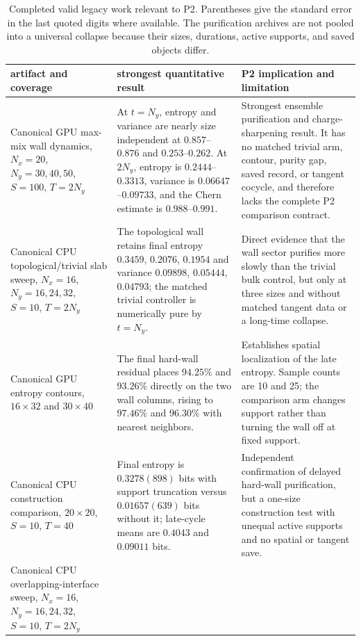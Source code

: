 \documentclass[aps,prx,twocolumn,floatfix,nofootinbib,superscriptaddress,longbibliography]{revtex4-2}
\newcommand{\campaignTableSetup}{%
  \footnotesize
  \setlength{\tabcolsep}{4pt}%
  \renewcommand{\arraystretch}{1.12}%
}
\begin{document}
\begin{table}[t]
\campaignTableSetup
\caption{Completed valid legacy work relevant to P2.  Parentheses give the standard error
in the last quoted digits where available.  The purification archives are not pooled into
a universal collapse because their sizes, durations, active supports, and saved objects
differ.}
\label{tab:P2-legacy}
\begin{tabularx}{\textwidth}{@{}L{0.75}L{1.10}L{1.15}@{}}
\toprule
artifact and coverage & strongest quantitative result & P2 implication and limitation \\
\midrule
Canonical GPU max-mix wall dynamics, $N_x=20$, $N_y=30,40,50$, $S=100$, $T=2N_y$
& At $t=N_y$, entropy and variance are nearly size independent at $0.857$--$0.876$ and
$0.253$--$0.262$.  At $2N_y$, entropy is $0.2444$--$0.3313$, variance is
$0.06647$--$0.09733$, and the Chern estimate is $0.988$--$0.991$.
& Strongest ensemble purification and charge-sharpening result.  It has no matched trivial
arm, contour, purity gap, saved record, or tangent cocycle, and therefore lacks the
complete P2 comparison contract.
\\
Canonical CPU topological/trivial slab sweep, $N_x=16$, $N_y=16,24,32$, $S=10$,
$T=2N_y$
& The topological wall retains final entropy $0.3459$, $0.2076$, $0.1954$ and variance
$0.09898$, $0.05444$, $0.04793$; the matched trivial controller is numerically pure by
$t=N_y$.
& Direct evidence that the wall sector purifies more slowly than the trivial bulk control,
but only at three sizes and without matched tangent data or a long-time collapse. \\
Canonical GPU entropy contours, $16\times32$ and $30\times40$
& The final hard-wall residual places $94.25\%$ and $93.26\%$ directly on the two wall
columns, rising to $97.46\%$ and $96.30\%$ with nearest neighbors.
& Establishes spatial localization of the late entropy.  Sample counts are 10 and 25;
the comparison arm changes support rather than turning the wall off at fixed support. \\
Canonical CPU construction comparison, $20\times20$, $S=10$, $T=40$
& Final entropy is $0.3278(898)$ bits with support truncation versus $0.01657(639)$ bits
without it; late-cycle means are $0.4043$ and $0.09011$ bits.
& Independent confirmation of delayed hard-wall purification, but a one-size construction
test with unequal active supports and no spatial or tangent save. \\
Canonical CPU overlapping-interface sweep, $N_x=16$, $N_y=16,24,32$, $S=10$, $T=2N_y$

\end{tabularx}
\end{table}
\end{document}
